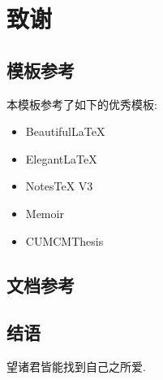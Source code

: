 \section{致谢}
\subsection{模板参考}
本模板参考了如下的优秀模板:

\begin{multicols}{2}
    \begin{itemize}
        \item Beautiful\LaTeX{}
        \item Elegant\LaTeX{}
        \item Notes\TeX{} V3
        \item Memoir
        \item CUMCMThesis
    \end{itemize}
\end{multicols}

\subsection{文档参考}

\subsection{结语}
望诸君皆能找到自己之所爱.
